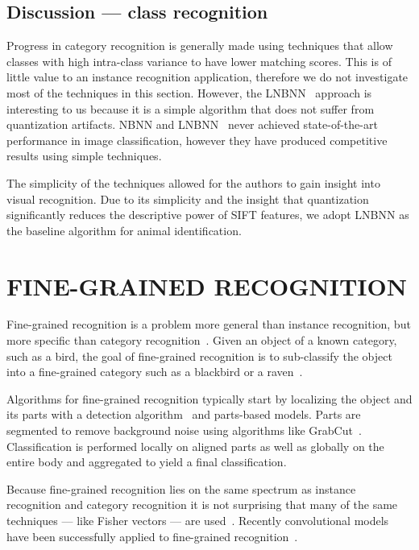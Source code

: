     \subsection{Discussion --- class recognition}

        Progress in category recognition is generally made using techniques that allow classes with high
        intra-class variance to have lower matching scores. This is of little value to an instance recognition
        application, therefore we do not investigate most of the techniques in this section. However, the
        LNBNN~\cite{mccann_local_2012} approach is interesting to us because it is a simple algorithm that does not
        suffer from quantization artifacts. NBNN and LNBNN~\cite{boiman_defense_2008,mccann_local_2012} never
        achieved state-of-the-art performance in image classification, however they have produced competitive
        results using simple techniques.

        The simplicity of the techniques allowed for the authors to gain insight into visual recognition. Due to
        its simplicity and the insight that quantization significantly reduces the descriptive power of SIFT
        features, we adopt LNBNN as the baseline algorithm for animal identification.


\section{FINE-GRAINED RECOGNITION}\label{sec:fgr}  

    Fine-grained recognition is a problem more general than instance recognition, but more specific than category
    recognition~\cite{parkhi_cats_2012, berg_poof_2013, gavves_local_2014}. Given an object of a known category,
    such as a bird, the goal of fine-grained recognition is to sub-classify the object into a fine-grained category
    such as a blackbird or a raven~\cite{berg_how_2013}.

    Algorithms for fine-grained recognition typically start by localizing the object and its parts with a detection
    algorithm~\cite{dalal_histograms_2005} and parts-based models. Parts are segmented to remove background noise
    using algorithms like GrabCut~\cite{rother_grabcut_2004}. Classification is performed locally on aligned parts
    as well as globally on the entire body and aggregated to yield a final classification.

    Because fine-grained recognition lies on the same spectrum as instance recognition and category recognition it
    is not surprising that many of the same techniques --- like Fisher vectors --- are
    used~\cite{gosselin_revisiting_2014}. Recently convolutional models have been successfully applied to
    fine-grained recognition~\cite{catherine_wah_similarity_2014, branson_bird_2014, zhang_weakly_2015,
    xiao_application_2015}.

